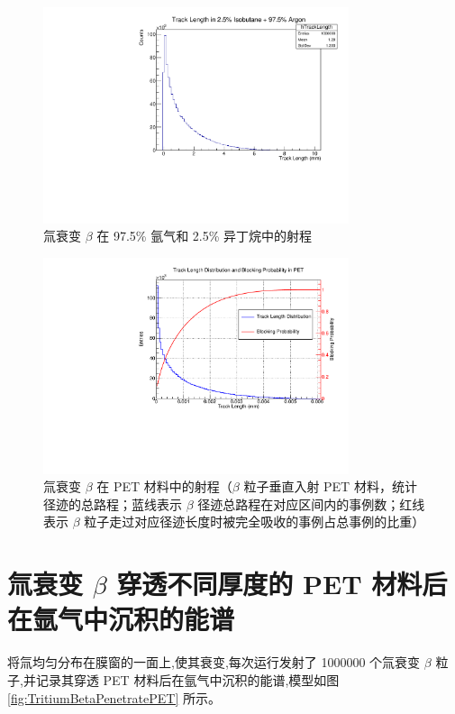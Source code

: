 \begin{figure}[htbp]
	\centering
	\includegraphics[width=0.8\textwidth]{figures/ArC4H10TrackLength.pdf}
	\caption{氚衰变 $\beta$ 在 97.5\% 氩气和 2.5\% 异丁烷中的射程}
	\label{fig:ArC4H10TrackLength}
\end{figure}

\begin{figure}[htbp]
	\centering
	\includegraphics[width=0.8\textwidth]{figures/PETTrackLength.pdf}
	\caption{氚衰变 $\beta$ 在 PET 材料中的射程（$\beta$ 粒子垂直入射 PET 材料，统计径迹的总路程；蓝线表示 $\beta$ 径迹总路程在对应区间内的事例数；红线表示 $\beta$ 粒子走过对应径迹长度时被完全吸收的事例占总事例的比重）}
	\label{fig:PETTrackLength}
\end{figure}

\section{氚衰变 $\beta$ 穿透不同厚度的 PET 材料后在氩气中沉积的能谱}

将氚均匀分布在膜窗的一面上,使其衰变,每次运行发射了 1000000 个氚衰变 $\beta$ 粒子,并记录其穿透 PET 材料后在氩气中沉积的能谱,模型如图 \ref{fig:TritiumBetaPenetratePET} 所示。

